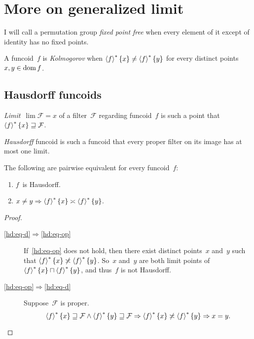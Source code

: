\chapter{More on generalized limit}

\begin{defn}
I will call a permutation group \emph{fixed point free} when
every element of it except of identity has no fixed points.
\end{defn}

\begin{defn}
A funcoid~$f$ is \emph{Kolmogorov} when
$\left\langle f\right\rangle ^{\ast}\{x\}\ne\left\langle f\right\rangle ^{\ast}\{y\}$ for every distinct points
$x,y\in\operatorname{dom} f$.
\end{defn}

\section{Hausdorff funcoids}

\begin{defn}
\emph{Limit}~$\lim\mathcal{F}=x$ of a filter~$\mathcal{F}$
regarding funcoid~$f$ is such a point that $\left\langle f\right\rangle ^{\ast}\{x\}\sqsupseteq\mathcal{F}$.
\end{defn}

\begin{defn}
\emph{Hausdorff} funcoid is such a funcoid that every proper
filter on its image has at most one limit.
\end{defn}

\begin{prop}
The following are pairwise equivalent for every funcoid~$f$:
\begin{enumerate}
\item\label{hd:eq-d} $f$~is Hausdorff.
\item\label{hd:eq-op}
$x\ne y\Rightarrow\left\langle f\right\rangle ^{\ast}\{x\}\asymp\left\langle f\right\rangle ^{\ast}\{y\}$.
\end{enumerate}
\end{prop}

\begin{proof}
~
\begin{description}
\item[\ref{hd:eq-d}$\Rightarrow$\ref{hd:eq-op}]
If~\ref{hd:eq-op} does not hold,
then there exist distinct points~$x$ and~$y$ such that
$\left\langle f\right\rangle ^{\ast}\{x\}\not\asymp\left\langle f\right\rangle ^{\ast}\{y\}$.
So~$x$ and~$y$ are both limit points of
$\left\langle f\right\rangle ^{\ast}\{x\}\sqcap\left\langle f\right\rangle ^{\ast}\{y\}$, and thus~$f$ is not
Hausdorff.
\item[\ref{hd:eq-op}$\Rightarrow$\ref{hd:eq-d}]
Suppose~$\mathcal{F}$ is proper.
\[ \left\langle f\right\rangle ^{\ast}\{x\}\sqsupseteq\mathcal{F}\land
\left\langle f\right\rangle ^{\ast}\{y\}\sqsupseteq\mathcal{F}\Rightarrow
\left\langle f\right\rangle ^{\ast}\{x\}\not\asymp\left\langle f\right\rangle ^{\ast}\{y\}\Rightarrow x=y. \]
\end{description}
\end{proof}

